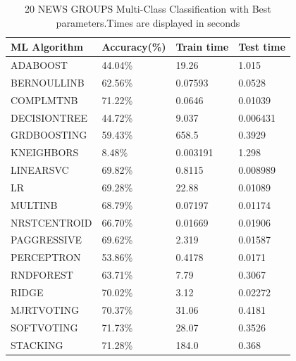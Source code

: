 \documentclass[conference]{IEEEtran}
\begin{document}
\begin{table}[H]
\caption{20 NEWS GROUPS Multi-Class Classification with Best parameters.Times are displayed in seconds}
\label{table:20news_best}
\begin{center}
\begin{adjustbox}{max width=0.99\textwidth}
\begin{tabular}{|l|l|l|l|}
\hline
   ML Algorithm                    & Accuracy(\%)  & Train time  & Test time  \\
  \hline
 ADABOOST           & 44.04\%                & 19.26                   & 1.015               \\
 BERNOULLINB                   & 62.56\%                & 0.07593                 & 0.0528              \\
 COMPLMTNB                  & 71.22\%                & 0.0646                  & 0.01039             \\
 DECISIONTREE      & 44.72\%               & 9.037                   & 0.006431            \\
GRDBOOSTING  & 59.43\%                & 658.5                   & 0.3929              \\
KNEIGHBORS        & 8.48\%                 & 0.003191                & 1.298               \\
 LINEARSVC                     & 69.82\%                & 0.8115                  & 0.008989            \\
 LR           & 69.28\%                & 22.88                   & 0.01089             \\
 MULTINB                 & 68.79\%                & 0.07197                 & 0.01174             \\
NRSTCENTROID               & 66.70\%              & 0.01669                 & 0.01906            
\\
PAGGRESSIVE & 69.62\%               & 2.319                   & 0.01587             \\
 PERCEPTRON                      & 53.86\%                & 0.4178                  & 0.0171              \\
RNDFOREST      & 63.71\%                & 7.79                    & 0.3067              \\
RIDGE               & 70.02\%               & 3.12                    & 0.02272             \\
MJRTVOTING    & 70.37\%                & 31.06                   & 0.4181              \\
SOFTVOTING         & 71.73\%                & 28.07                   & 0.3526              \\
STACKING            & 71.28\%                & 184.0                   & 0.368              \\
\hline
\end{tabular}
\end{adjustbox}
\end{center}
\end{table}
\end{document}
